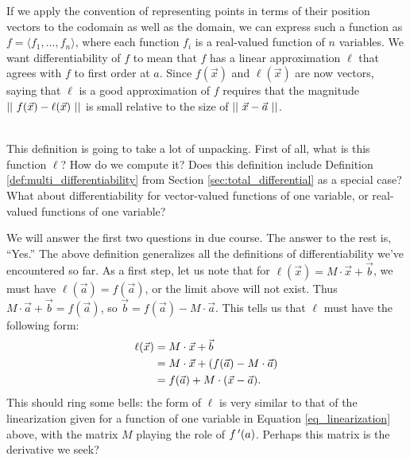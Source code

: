 If we apply the convention of representing points in terms of their position vectors to the codomain as well as the domain, we can express such a function as $f=\langle f_1,\ldots, f_n\rangle$, where each function $f_i$ is a real-valued function of $n$ variables. We want differentiability of $f$ to mean that $f$ has a linear approximation $\ell$ that agrees with $f$ to first order at $a$. Since $f(\vec{x})$ and $\ell(\vec{x})$ are now vectors, saying that $\ell$ is a good approximation of $f$ requires that the magnitude $||\ f(\vec{x})-\ell(\vec{x})\ ||$ is small relative to the size of $||\ \vec{x}-\vec{a}\ ||$.\\

\\
\enlargethispage{2\baselineskip}

This definition is going to take a lot of unpacking. First of all, what is this function $\ell$? How do we compute it? Does this definition include Definition \ref{def:multi_differentiability} from Section \ref{sec:total_differential} as a special case? What about differentiability for vector-valued functions of one variable, or real-valued functions of one variable?

We will answer the first two questions in due course. The answer to the rest is, ``Yes.'' The above definition generalizes all the definitions of differentiability we've encountered so far. As a first step, let us note that for $\ell(\vec{x})=M\cdot \vec{x}+\vec{b}$, we must have $\ell(\vec{a})=f(\vec{a})$, or the limit above will not exist. Thus $M\cdot \vec{a}+\vec{b} = f(\vec{a})$, so $\vec{b}=f(\vec{a})-M\cdot \vec{a}$. This tells us that $\ell$ must have the following form:
\begin{align}
\ell(\vec{x}) &= M\cdot \vec{x} + \vec{b}\notag\\
&= M\cdot \vec{x} + (f(\vec{a}) - M\cdot \vec{a})\notag\\
& = f(\vec{a})+M\cdot (\vec{x}-\vec{a}).\label{eq_gen_linear}
\end{align}
This should ring some bells: the form of $\ell$ is very similar to that of the linearization given for a function of one variable in Equation \eqref{eq_linearization} above, with the matrix $M$ playing the role of $f\,'(a)$. Perhaps this matrix is the derivative we seek?\\
 
